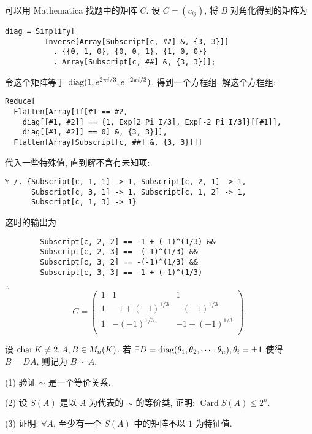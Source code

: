 \documentclass[color=black,device=normal,lang=cn,mode=geye]{elegantnote}
\begin{document}
\begin{note}
    可以用 Mathematica 找题中的矩阵 $C$. 设 $C=(c_{ij})$, 将 $B$ 对角化得到的矩阵为
    \begin{lstlisting}
diag = Simplify[
         Inverse[Array[Subscript[c, ##] &, {3, 3}]]
           . {{0, 1, 0}, {0, 0, 1}, {1, 0, 0}}
           . Array[Subscript[c, ##] &, {3, 3}]];
    \end{lstlisting}

    令这个矩阵等于 $\operatorname{diag}(1,e^{2\pi i/3},e^{-2\pi i/3})$, 得到一个方程组. 解这个方程组:
    \begin{lstlisting}
Reduce[
  Flatten[Array[If[#1 == #2, 
    diag[[#1, #2]] == {1, Exp[2 Pi I/3], Exp[-2 Pi I/3]}[[#1]], 
    diag[[#1, #2]] == 0] &, {3, 3}]], 
  Flatten[Array[Subscript[c, ##] &, {3, 3}]]]
    \end{lstlisting}
    
    代入一些特殊值, 直到解不含有未知项:
    \begin{lstlisting}
% /. {Subscript[c, 1, 1] -> 1, Subscript[c, 2, 1] -> 1, 
      Subscript[c, 3, 1] -> 1, Subscript[c, 1, 2] -> 1, 
      Subscript[c, 1, 3] -> 1}
    \end{lstlisting}
    
    这时的输出为
    \begin{lstlisting}
        Subscript[c, 2, 2] == -1 + (-1)^(1/3) && 
        Subscript[c, 2, 3] == -(-1)^(1/3) && 
        Subscript[c, 3, 2] == -(-1)^(1/3) && 
        Subscript[c, 3, 3] == -1 + (-1)^(1/3)
    \end{lstlisting}

    $\therefore$
    \[C=\begin{pmatrix}
        1 & 1 & 1 \\
        1 & -1 + (-1)^{1/3} & -(-1)^{1/3} \\
        1 & -(-1)^{1/3} & -1 + (-1)^{1/3} \\
    \end{pmatrix}.\]
\end{note}
\begin{exercise}%
    设 $\operatorname{char} K\neq2,A,B\in M_n(K)$. 若 $\exists D=\operatorname{diag} (\theta_1,\theta_2,\cdots,\theta_n),\theta_i=\pm1$ 使得 $B=DA$, 则记为 $B\sim A$.

    (1) 验证 $\sim$ 是一个等价关系.

    (2) 设 $S(A)$ 是以 $A$ 为代表的 $\sim$ 的等价类, 证明: $\operatorname{Card}S(A)\leq2^n$.

    (3) 证明: $\forall A$, 至少有一个 $S(A)$ 中的矩阵不以 $1$ 为特征值.
\end{exercise}
\end{document}
